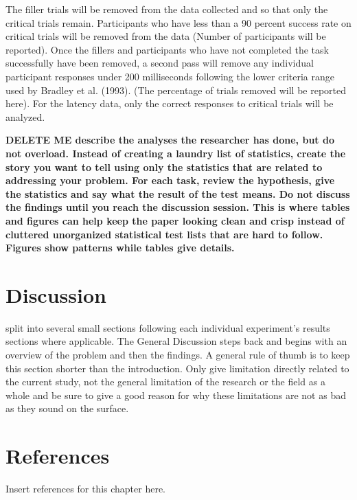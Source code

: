 The filler trials will be removed from the data collected and so that only the critical trials remain. Participants who have less than a 90 percent success rate on critical trials will be removed from the data (Number of participants will be reported). Once the fillers and participants who have not completed the task successfully have been removed, a second pass will remove any individual participant responses under 200 milliseconds following the lower criteria range used by Bradley et al. (1993). (The percentage of trials removed will be reported here). For the latency data, only the correct responses to critical trials will be analyzed.

\textbf{DELETE ME describe the analyses the researcher has done, but do not overload. Instead of creating a laundry list of statistics, create the story you want to tell using only the statistics that are related to addressing your problem. 
For each task, review the hypothesis, give the statistics and say what the result of the test means. 
Do not discuss the findings until you reach the discussion session. 
This is where tables and figures can help keep the paper looking clean and crisp instead of cluttered unorganized statistical test lists that are hard to follow. 
Figures show patterns while tables give details.}



\section{Discussion}

split into several small sections following each individual experiment’s results sections where applicable. 
The General Discussion steps back and begins with an overview of the problem and then the findings. A general rule of thumb is to keep this section shorter than the introduction. Only give limitation directly related to the current study, not the general limitation of the research or the field as a whole and be sure to give a good reason for why these limitations are not as bad as they sound on the surface.



\section{References}

Insert references for this chapter here.